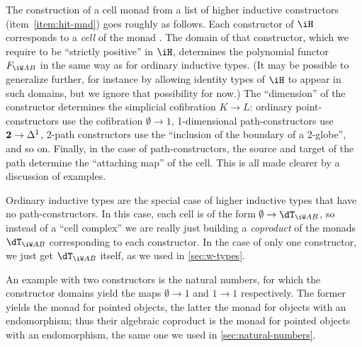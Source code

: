 \documentclass[referee]{psp}
\let\W\iW
\begin{document}
The construction of a cell monad from a list of higher inductive constructors (item~\ref{item:hit-mnd}) goes roughly as follows.
Each constructor of $\iH$ corresponds to a \emph{cell} of the monad \dT.
The domain of that constructor, which we require to be ``strictly positive'' in $\iH$, determines the polynomial functor $F_{\W A B}$ in the same way as for ordinary inductive types.
(It may be possible to generalize further, for instance by allowing identity types of $\iH$ to appear in such domains, but we ignore that possibility for now.)
The ``dimension'' of the constructor determines the simplicial cofibration $K\to L$: ordinary point-constructors use the cofibration $\emptyset\to 1$, 1-dimensional path-constructors use $\mathbf{2}\to{\Delta^1}$, 2-path constructors use the ``inclusion of the boundary of a 2-globe'', and so on.
Finally, in the case of path-constructors, the source and target of the path determine the ``attaching map'' of the cell.
This is all made clearer by a discussion of examples.

\begin{eg} \label{eg:ordinary-inductives}
  Ordinary inductive types are the special case of higher inductive types that have no path-constructors.
  In this case, each cell is of the form $\emptyset \to \dT_{\W A B}$, so instead of a ``cell complex'' we are really just building a \emph{coproduct} of the monads $\dT_{\W A B}$ corresponding to each constructor.
  In the case of only one constructor, we just get $\dT_{\W A B}$ itself, as we used in \cref{sec:w-types}.

  An example with two constructors is the natural numbers, for which the constructor domains yield the maps $\emptyset\to 1$ and $1\to 1$ respectively.
  The former yields the monad for pointed objects, the latter the monad for objects with an endomorphism; thus their algebraic coproduct is the monad for pointed objects with an endomorphism, the same one we used in \cref{sec:natural-numbers}.
\end{eg}
\end{document}

